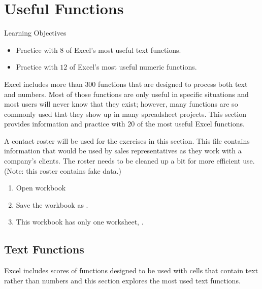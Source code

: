 \section{Useful Functions}

\begin{center}
	\begin{objbox}{Learning Objectives}
		\begin{itemize}
			\setlength{\itemsep}{0pt}
			\setlength{\parskip}{0pt}
			\setlength{\parsep}{0pt}
			
			\item Practice with $ 8 $ of Excel's most useful text functions.
			\item Practice with $ 12 $ of Excel's most useful numeric functions.
			
		\end{itemize}
	\end{objbox}
\end{center}

Excel includes more than $ 300 $ functions that are designed to process both text and numbers. Most of those functions are only useful in specific situations and most users will never know that they exist; however, many functions are so commonly used that they show up in many spreadsheet projects. This section provides information and practice with $ 20 $ of the most useful Excel functions.

A contact roster will be used for the exercises in this section. This file contains information that would be used by sales representatives as they work with a company's clients. The roster needs to be cleaned up a bit for more efficient use. (Note: this roster contains fake data.)

\begin{enumerate}
	\item Open workbook 
	\item Save the workbook as .
	\item This workbook has only one worksheet, .
\end{enumerate}

\subsection{Text Functions}

Excel includes scores of functions designed to be used with cells that contain text rather than numbers and this section explores the most used text functions.

